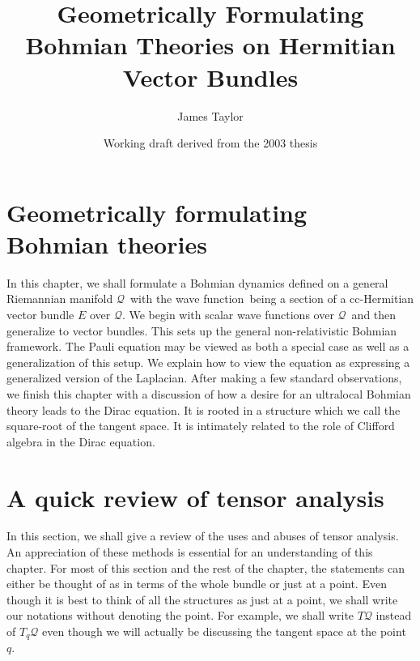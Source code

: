 \documentclass[11pt]{article}
\title{Geometrically Formulating Bohmian Theories on Hermitian Vector Bundles}
\author{James Taylor}
\date{Working draft derived from the 2003 thesis}
\theoremstyle{remark}
\begin{document}
\maketitle

\section{Geometrically formulating Bohmian
  theories} \label{c:geom} 


In this chapter, we shall formulate a Bohmian dynamics defined on a general
Riemannian manifold  \ensuremath{\mathcal{Q}}\ with the wave function\ being a section of a 
cc-Hermitian
vector bundle $E$ over \ensuremath{\mathcal{Q}}. 
 We begin with scalar wave functions over \ensuremath{\mathcal{Q}}\ and then 
 generalize 
to vector bundles. This sets up the general 
non-relativistic 
Bohmian framework. The Pauli equation may be viewed as both a special
case as well as a generalization of this
setup.
We explain how to view the equation as expressing a generalized
version of the Laplacian. After making a few standard observations, 
we finish this chapter with a discussion of how a desire for an
ultralocal Bohmian theory  leads to the Dirac equation. 
It is rooted in a structure which we call the square-root of
the tangent space. 
It is intimately related to the role of Clifford algebra in the Dirac
equation. 

\section{A quick review of tensor analysis}

In this section, we shall give a review of the uses and abuses of
tensor analysis. An appreciation of these methods is essential for an
understanding of this chapter. For most of this section and the rest
of the chapter, the statements can either be thought of as in terms of
the whole bundle or just at a point. Even though it is best to think
of all the structures as just at a point, we shall write our notations
without denoting the point. For example, we shall write
$T\ensuremath{\mathcal{Q}}$ instead of $T_q \ensuremath{\mathcal{Q}}$ even though we will actually be 
discussing the tangent space at the point $q$. 
\end{document}
